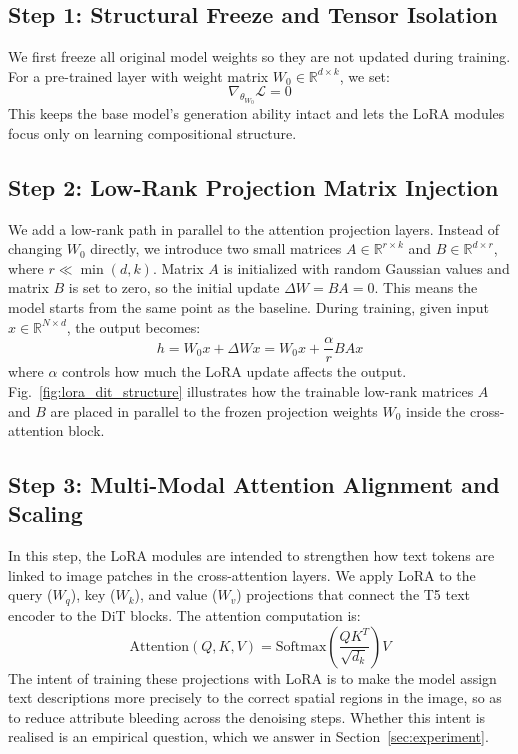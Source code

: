 \documentclass[12pt,onecolumn]{IEEEtran}
\begin{document}
\subsection{Step 1: Structural Freeze and Tensor Isolation}
We first freeze all original model weights so they are not updated during training. For a pre-trained layer with weight matrix $W_0 \in \mathbb{R}^{d \times k}$, we set:
\begin{equation}
\nabla_{\theta_{W_0}} \mathcal{L} = 0
\end{equation}
This keeps the base model's generation ability intact and lets the LoRA modules focus only on learning compositional structure.

\subsection{Step 2: Low-Rank Projection Matrix Injection}
We add a low-rank path in parallel to the attention projection layers. Instead of changing $W_0$ directly, we introduce two small matrices $A \in \mathbb{R}^{r \times k}$ and $B \in \mathbb{R}^{d \times r}$, where $r \ll \min(d, k)$. Matrix $A$ is initialized with random Gaussian values and matrix $B$ is set to zero, so the initial update $\Delta W = BA = 0$. This means the model starts from the same point as the baseline. During training, given input $x \in \mathbb{R}^{N \times d}$, the output becomes:
\begin{equation}
h = W_0 x + \Delta W x = W_0 x + \frac{\alpha}{r} B A x
\end{equation}
where $\alpha$ controls how much the LoRA update affects the output. Fig.~\ref{fig:lora_dit_structure} illustrates how the trainable low-rank matrices $A$ and $B$ are placed in parallel to the frozen projection weights $W_0$ inside the cross-attention block.

\subsection{Step 3: Multi-Modal Attention Alignment and Scaling}
In this step, the LoRA modules are intended to strengthen how text tokens are linked to image patches in the cross-attention layers. We apply LoRA to the query ($W_q$), key ($W_k$), and value ($W_v$) projections that connect the T5 text encoder to the DiT blocks. The attention computation is:
\begin{equation}
\text{Attention}(Q, K, V) = \text{Softmax}\left(\frac{Q K^T}{\sqrt{d_k}}\right) V
\end{equation}
The intent of training these projections with LoRA is to make the model assign
text descriptions more precisely to the correct spatial regions in the image,
so as to reduce attribute bleeding across the denoising steps. Whether this
intent is realised is an empirical question, which we answer in
Section~\ref{sec:experiment}.
\end{document}
